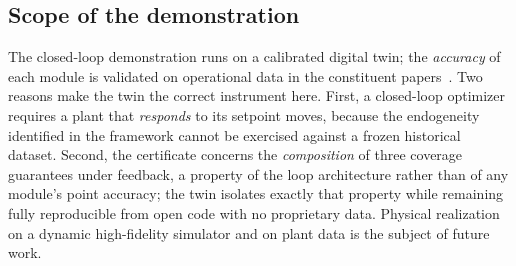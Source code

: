 \subsection{Scope of the demonstration}
\label{sec:scope}

The closed-loop demonstration runs on a calibrated digital twin; the
\emph{accuracy} of each module is validated on operational data in the constituent
papers~\citep{busico_m1,busico_m2,busico_m3}. Two reasons make the twin the correct
instrument here. First, a closed-loop optimizer requires a plant that
\emph{responds} to its setpoint moves, because the endogeneity identified in the
framework cannot be exercised against a frozen historical dataset. Second, the
certificate concerns the \emph{composition} of three coverage guarantees under
feedback, a property of the loop architecture rather than of any module's point
accuracy; the twin isolates exactly that property while remaining fully
reproducible from open code with no proprietary data. Physical realization on a
dynamic high-fidelity simulator and on plant data is the subject of future work.
